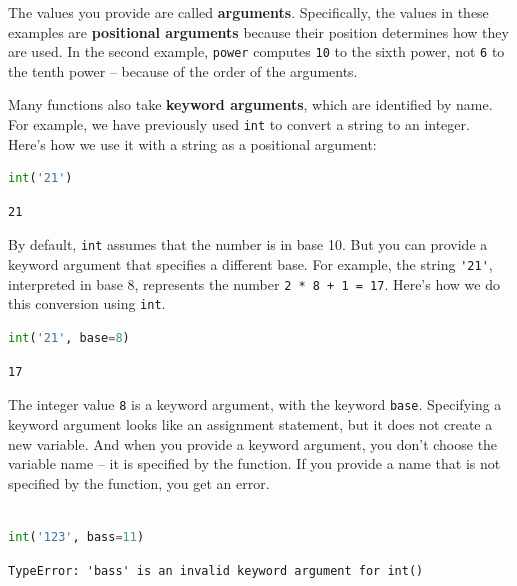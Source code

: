 The values you provide are called \textbf{arguments}. Specifically, the
values in these examples are \textbf{positional arguments} because their
position determines how they are used. In the second example,
\passthrough{\lstinline!power!} computes \passthrough{\lstinline!10!} to
the sixth power, not \passthrough{\lstinline!6!} to the tenth power --
because of the order of the arguments.

Many functions also take \textbf{keyword arguments}, which are
identified by name. For example, we have previously used
\passthrough{\lstinline!int!} to convert a string to an integer. Here's
how we use it with a string as a positional argument:

\begin{lstlisting}[language=Python,style=source]
int('21')
\end{lstlisting}

\begin{lstlisting}[style=output]
21
\end{lstlisting}

By default, \passthrough{\lstinline!int!} assumes that the number is in
base 10. But you can provide a keyword argument that specifies a
different base. For example, the string \passthrough{\lstinline!'21'!},
interpreted in base 8, represents the number
\passthrough{\lstinline!2 * 8 + 1 = 17!}. Here's how we do this
conversion using \passthrough{\lstinline!int!}.

\begin{lstlisting}[language=Python,style=source]
int('21', base=8)
\end{lstlisting}

\begin{lstlisting}[style=output]
17
\end{lstlisting}

The integer value \passthrough{\lstinline!8!} is a keyword argument,
with the keyword \passthrough{\lstinline!base!}. Specifying a keyword
argument looks like an assignment statement, but it does not create a
new variable. And when you provide a keyword argument, you don't choose
the variable name -- it is specified by the function. If you provide a
name that is not specified by the function, you get an error.

\begin{lstlisting}[language=Python,style=source]
%%expect TypeError

int('123', bass=11)
\end{lstlisting}

\begin{lstlisting}[style=output]
TypeError: 'bass' is an invalid keyword argument for int()
\end{lstlisting}

